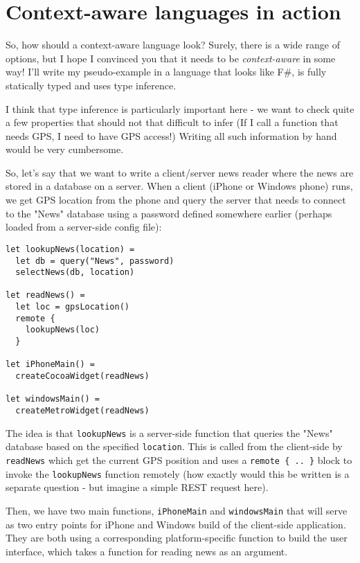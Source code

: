 
\section{Context-aware languages in action}

So, how should a context-aware language look? Surely, there is a wide range of options, but I hope
I convinced you that it needs to be \emph{context-aware} in some way! I'll write my pseudo-example in a
language that looks like F\#, is fully statically typed and uses type inference.

I think that type inference is particularly important here - we want to check quite a few properties
that should not that difficult to infer (If I call a function that needs GPS, I need to have GPS access!)
Writing all such information by hand would be very cumbersome.

So, let's say that we want to write a client/server news reader where the news are stored in a 
database on a server. When a client (iPhone or Windows phone) runs, we get GPS location from the
phone and query the server that needs to connect to the "News" database using a password defined
somewhere earlier (perhaps loaded from a server-side config file):

\begin{verbatim}
let lookupNews(location) =
  let db = query("News", password)
  selectNews(db, location)  

let readNews() =
  let loc = gpsLocation()       
  remote { 
    lookupNews(loc) 
  } 

let iPhoneMain() =
  createCocoaWidget(readNews)

let windowsMain() =    
  createMetroWidget(readNews)
\end{verbatim}

The idea is that \texttt{lookupNews} is a server-side function that queries the "News" database based on 
the specified \texttt{location}. This is called from the client-side by \texttt{readNews} which get the current GPS
position and uses a \texttt{remote \{ .. \}} block to invoke the \texttt{lookupNews} function remotely (how exactly would
this be written is a separate question - but imagine a simple REST request here).

Then, we have two main functions, \texttt{iPhoneMain} and \texttt{windowsMain} that will serve as two entry points
for iPhone and Windows build of the client-side application. They are both using a corresponding
platform-specific function to build the user interface, which takes a function for reading news as an
argument.

